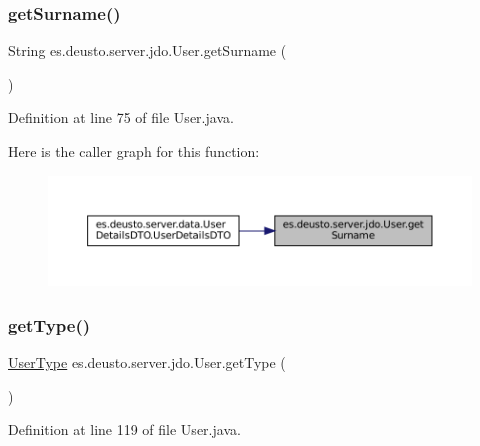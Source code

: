 \subsubsection{\texorpdfstring{getSurname()}{getSurname()}}
{\footnotesize\ttfamily String es.\+deusto.\+server.\+jdo.\+User.\+get\+Surname (\begin{DoxyParamCaption}{ }\end{DoxyParamCaption})}



Definition at line 75 of file User.\+java.

Here is the caller graph for this function\+:
\nopagebreak
\begin{figure}[H]
\begin{center}
\leavevmode
\includegraphics[width=350pt]{classes_1_1deusto_1_1server_1_1jdo_1_1_user_adc7114247c7881e3f9e0fd14b7905f9a_icgraph}
\end{center}
\end{figure}
\mbox{\label{classes_1_1deusto_1_1server_1_1jdo_1_1_user_ac7a47d7d9f3b6212ea22d2fe6b0e8457}} 
\subsubsection{\texorpdfstring{getType()}{getType()}}
{\footnotesize\ttfamily \mbox{\hyperlink{enumes_1_1deusto_1_1server_1_1jdo_1_1_user_type}{User\+Type}} es.\+deusto.\+server.\+jdo.\+User.\+get\+Type (\begin{DoxyParamCaption}{ }\end{DoxyParamCaption})}



Definition at line 119 of file User.\+java.

\mbox{\label{classes_1_1deusto_1_1server_1_1jdo_1_1_user_affc32b9cc71d8e45cb695339b34a2abd}} 
